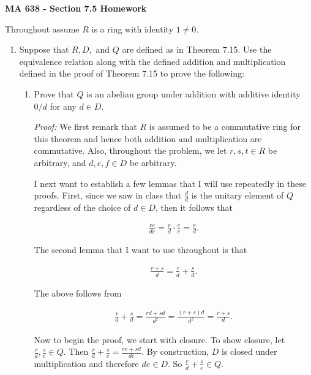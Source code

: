 \documentclass[11pt]{article}
\def\noin{\noindent}
\begin{document}
\thispagestyle{empty}
%
%


\large
\noin \textbf{MA 638 - Section 7.5 Homework}\\


\normalsize



Throughout assume $R$ is a ring with identity $1\ne 0$.

\begin{enumerate}

\item Suppose that $R,D,$ and $Q$ are defined as in Theorem 7.15.  Use the equivalence relation along with the defined addition and multiplication defined in the proof of Theorem 7.15 to prove the following:

  \begin{enumerate}
    \item Prove that $Q$ is an abelian group under addition with additive identity $0/d$ for any $d\in D$.

    {\it Proof:} We first remark that $R$ is assumed to be a commutative ring for this theorem and hence both addition and multiplication are commutative.  Also, throughout the problem, we let $r,s,t\in R$ be arbitrary, and $d,e,f\in D$ be arbitrary.

    I next want to establish a few lemmas that I will use repeatedly in these proofs.  First, since we saw in class that $\frac d d$ is the unitary element of $Q$ regardless of the choice of $d\in D$, then it follows that

    \begin{align*}
      \frac{re}{de}=\frac r d\cdot \frac e e = \frac r d.
    \end{align*}

    The second lemma that I want to use throughout is that

    \begin{align*}
      \frac{r+s}{d}=\frac{r}{d}+\frac{s}{d}.
    \end{align*}

    The above follows from

    \begin{align*}
      \frac r d +\frac s d = \frac{rd+sd}{d^2} = \frac{(r+s)d}{d^2}=\frac{r+s}{d}.
    \end{align*}

    Now to begin the proof, we start with closure.  To show closure, let $\frac r d, \frac{s}{e} \in Q$.  Then $\frac r d +\frac{s}{e}=\frac{re+sd}{de}$.  By construction, $D$ is closed under multiplication and therefore $de\in D$.  So $\frac r d +\frac s e\in Q$.


\end{enumerate}
\end{enumerate}
\end{document}
